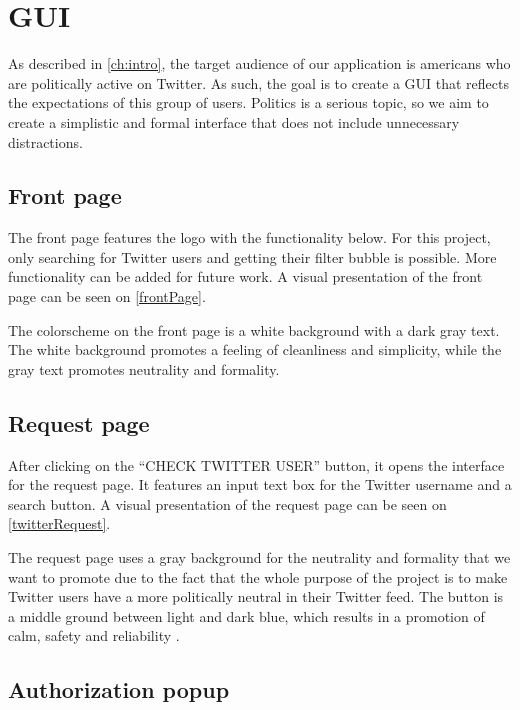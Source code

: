 \chapter{GUI} \label{GUI}
As described in \autoref{ch:intro}, the target audience of our application is
americans who are politically active on Twitter. As such, the goal is to create
a GUI that reflects the expectations of this group of users. Politics is a serious
topic, so we aim to create a simplistic and formal interface that does not
include unnecessary distractions.

\section{Front page}
The front page features the logo with the functionality below. For this
project, only searching for Twitter users and getting their filter bubble is
possible. More functionality can be added for future work. A visual
presentation of the front page can be seen on \autoref{frontPage}.

{}

The colorscheme on the front page is a white background with a dark gray text.
The white background promotes a feeling of cleanliness and simplicity, while the
gray text promotes neutrality and formality\citep[p. 63 \& 64]{WebUI}. 

\section{Request page}
After clicking on the ``CHECK TWITTER USER'' button, it opens the interface for
the request page. It features an input text box for the Twitter username and a
search button. A visual presentation of the request page can be seen on \autoref{twitterRequest}.


The request page uses a gray background for the neutrality and formality that we
want to promote due to the fact that the whole purpose of the project is to
make Twitter users have a more politically neutral in their Twitter feed.
The button is a middle ground between light and dark blue, which results in
a promotion of calm, safety and reliability \citep[p. 61 \& 64]{WebUI}.

\section{Authorization popup}


